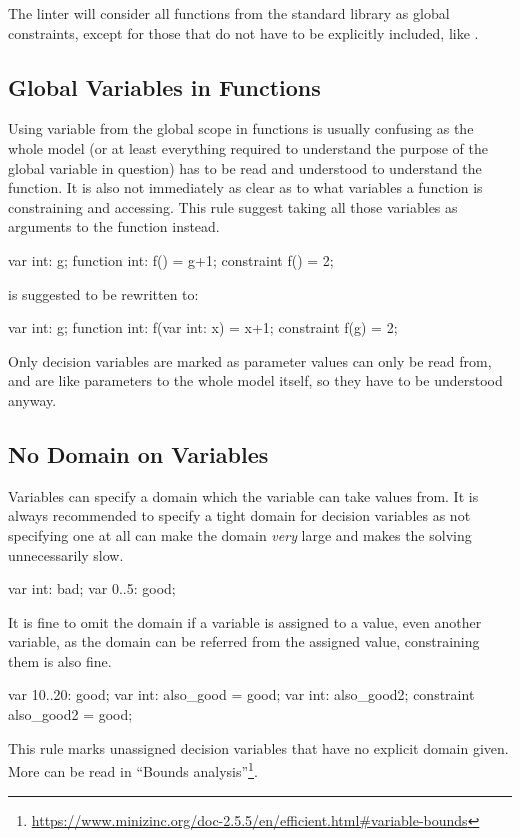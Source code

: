 \documentclass[a4paper,12pt]{article}
\begin{document}
The linter will consider all functions from the standard library as global constraints,
except for those that do not have to be explicitly included, like .

\subsection{Global Variables in Functions}\label{sec:rule:globalfun}
Using variable from the global scope in functions is usually confusing as the whole model
(or at least everything required to understand the purpose of the global variable in
question) has to be read and understood to understand the function. It is also not
immediately as clear as to what variables a function is constraining and accessing. This rule
suggest taking all those variables as arguments to the function instead.

\begin{mznnobreak}
var int: g;
function int: f() = g+1;
constraint f() = 2;
\end{mznnobreak}
is suggested to be rewritten to:
\begin{mznnobreak}
var int: g;
function int: f(var int: x) = x+1;
constraint f(g) = 2;
\end{mznnobreak}

Only decision variables are marked as parameter values can only be read from, and are like
parameters to the whole model itself, so they have to be understood anyway.

\subsection{No Domain on Variables}\label{sec:rule:nodomain}
Variables can specify a domain which the variable can take values from. It is always
recommended to specify a tight domain for decision variables as not specifying one at all
can make the domain \emph{very} large and makes the solving unnecessarily slow.
\begin{mznnobreak}
var int: bad;
var 0..5: good;
\end{mznnobreak}
It is fine to omit the domain if a variable is assigned to a value, even another variable,
as the domain can be referred from the assigned value, constraining them is also fine.
\begin{mznnobreak}
var 10..20: good;
var int: also_good = good;
var int: also_good2;
constraint also_good2 = good;
\end{mznnobreak}
This rule marks unassigned decision variables that have no explicit domain given.
More can be read in ``Bounds analysis''\footnote{\url{https://www.minizinc.org/doc-2.5.5/en/efficient.html\#variable-bounds}}.
\end{document}
